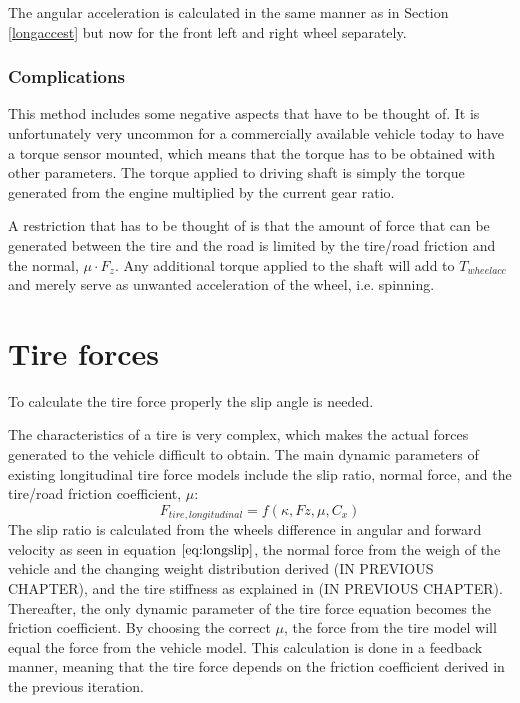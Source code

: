 The angular acceleration is calculated in the same manner as in Section \ref{longaccest} but now for the front left and right wheel separately.
\subsubsection{Complications}
This method includes some negative aspects that have to be thought of. It is unfortunately very uncommon for a commercially available vehicle today to have a torque sensor mounted, which means that the torque has to be obtained with other parameters. The torque applied to driving shaft is simply the torque generated from the engine multiplied by the current gear ratio.

A restriction that has to be thought of is that the amount of force that can be generated between the tire and the road is limited by the tire/road friction and the normal, $ \mu \cdot F_{z} $. Any additional torque applied to the shaft will add to $ T_{wheelacc} $ and merely serve as unwanted acceleration of the wheel, i.e. spinning.

\section{Tire forces}
To calculate the tire force properly the slip angle is needed. 

The characteristics of a tire is very complex, which makes the actual forces generated to the vehicle  difficult to obtain. The main dynamic parameters of existing longitudinal tire force models include the slip ratio, normal force, and the tire/road friction coefficient, $ \mu $:
\begin{equation}
F_{tire, longitudinal} = f(\kappa, Fz, \mu, C_{x})
\end{equation}
The slip ratio is calculated from the wheels difference in angular and forward velocity as seen in equation $ \ref{eq:longslip} $, the normal force from the weigh of the vehicle and the changing weight distribution derived (IN PREVIOUS CHAPTER), and the tire stiffness as explained  in (IN PREVIOUS CHAPTER). Thereafter, the only dynamic parameter of the tire force equation becomes the friction coefficient. By choosing the correct $ \mu $, the force from the tire model will equal the force from the vehicle model. This calculation is done in a feedback manner, meaning that the tire force depends on the friction coefficient derived in the previous iteration.

